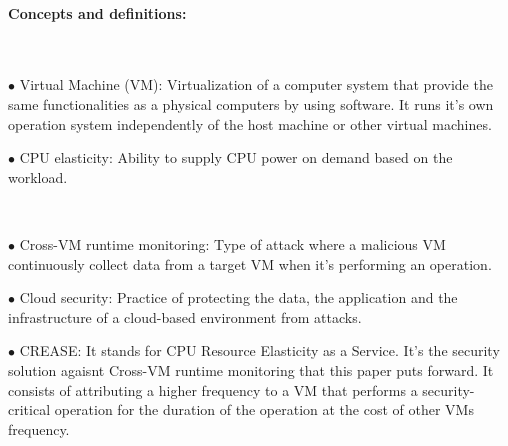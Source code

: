 \documentclass[11pt]{article}
\begin{document}
\paragraph{Concepts and definitions:} 
~\newline ~\newline
\begin{minipage}[t]{1\textwidth}
    \begin{description}
    \item $\bullet$ Virtual Machine (VM): Virtualization of a computer system that provide the same functionalities as a physical computers by using software. It runs it’s own operation system independently of the host machine or other virtual machines.
    \item $\bullet$ CPU elasticity: Ability to supply CPU power on demand based on the workload. 
    \end{description}
\end{minipage}
\\
\begin{minipage}[t]{1\textwidth}
    \begin{description}
    \item $\bullet$ Cross-VM runtime monitoring: Type of attack where a malicious VM continuously collect data from a target VM when it's performing an operation. 
    \item $\bullet$ Cloud security: Practice of protecting the data, the application and the infrastructure of a cloud-based environment from attacks. 
    \item $\bullet$ CREASE: It stands for CPU Resource Elasticity as a Service. It's the security solution agaisnt Cross-VM runtime monitoring that this paper puts forward. It consists of attributing a higher frequency to a VM that performs a security-critical operation for the duration of the operation at the cost of other VMs frequency.     
    \end{description}
\end{minipage}

~\newline
\end{document}
